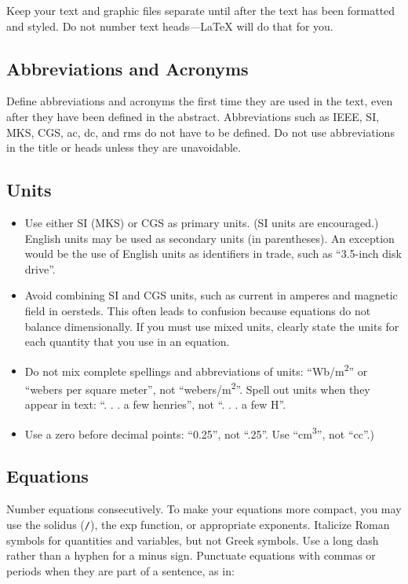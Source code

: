 \documentclass[conference]{IEEEtran}
\begin{document}
Keep your text and graphic files separate until after the text has been formatted and styled. Do not number text heads---\LaTeX{} will do that for you.

\subsection{Abbreviations and Acronyms}
\label{sec:org15269bc}
   Define abbreviations and acronyms the first time they are used in the text, even after they have been defined in the abstract. Abbreviations such as IEEE, SI, MKS, CGS, ac, dc, and rms do not have to be defined. Do not use 
abbreviations in the title or heads unless they are unavoidable.

\subsection{Units}
\label{sec:org4d40d22}
\begin{itemize}
\item Use either SI (MKS) or CGS as primary units. (SI units are encouraged.) English units may be used as secondary units (in parentheses). An exception would be the use of English units as identifiers in trade, such as ``3.5-inch disk drive''.
\item Avoid combining SI and CGS units, such as current in amperes and magnetic field in oersteds. This often leads to confusion because equations do not balance dimensionally. If you must use mixed units, clearly state the units for each quantity that you use in an equation.
\item Do not mix complete spellings and abbreviations of units: ``Wb/m\textsuperscript{2}'' or ``webers per square meter'', not ``webers/m\textsuperscript{2}''. Spell out units when they appear in text: ``. . . a few henries'', not ``. . . a few H''.
\item Use a zero before decimal points: ``0.25'', not ``.25''. Use ``cm\textsuperscript{3}'', not ``cc''.)
\end{itemize}

\subsection{Equations}
\label{sec:org87ab63e}
   Number equations consecutively. To make your equations more compact, you may use the solidus (\texttt{/}), the exp function, or 
appropriate exponents. Italicize Roman symbols for quantities and variables, but not Greek symbols. Use a long dash rather than a hyphen for a minus sign. Punctuate equations with commas or periods when they are part of a 
sentence, as in:
\end{document}
